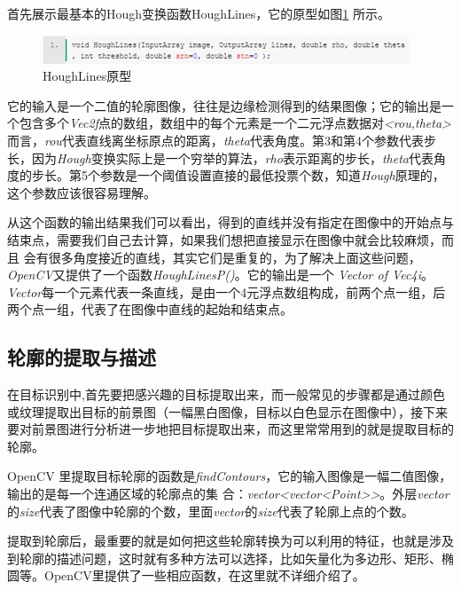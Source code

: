 \documentclass{XDBAthesis}
\begin{document}
首先展示最基本的Hough变换函数HoughLines，它的原型如图\ref{fg:yuan} 所示。
\begin{figure}[htb]
    \centering
    \includegraphics[width=\textwidth]{figure/code}
    \caption{HoughLines原型}
    \label{fg:yuan}
\end{figure}

 

    它的输入是一个二值的轮廓图像，往往是边缘检测得到的结果图像；它的输出是一个包含多个\emph{Vec2f}点的数组，数组中的每个元素是一个二元浮点数据对\emph{<rou,theta>}而言，\emph{rou}代表直线离坐标原点的距离，\emph{theta}代表角度。第3和第4个参数代表步长，因为\emph{Hough}变换实际上是一个穷举的算法，\emph{rho}表示距离的步长，\emph{theta}代表角度的步长。第5个参数是一个阈值设置直接的最低投票个数，知道\emph{Hough}原理的，这个参数应该很容易理解。

   从这个函数的输出结果我们可以看出，得到的直线并没有指定在图像中的开始点与结束点，需要我们自己去计算，如果我们想把直接显示在图像中就会比较麻烦，而且 会有很多角度接近的直线，其实它们是重复的，为了解决上面这些问题，\emph{OpenCV}又提供了一个函数\emph{HoughLinesP()}。它的输出是一个 \emph{Vector of Vec4i}。\emph{Vector}每一个元素代表一条直线，是由一个4元浮点数组构成，前两个点一组，后两个点一组，代表了在图像中直线的起始和结束点。

\subsection{轮廓的提取与描述}

在目标识别中,首先要把感兴趣的目标提取出来，而一般常见的步骤都是通过颜色或纹理提取出目标的前景图（一幅黑白图像，目标以白色显示在图像中），接下来要对前景图进行分析进一步地把目标提取出来，而这里常常用到的就是提取目标的轮廓。

OpenCV 里提取目标轮廓的函数是\emph{findContours}，它的输入图像是一幅二值图像，输出的是每一个连通区域的轮廓点的集 合：\emph{vector<vector<Point>>}。外层\emph{vector}的\emph{size}代表了图像中轮廓的个数，里面\emph{vector}的\emph{size}代表了轮廓上点的个数。

提取到轮廓后，最重要的就是如何把这些轮廓转换为可以利用的特征，也就是涉及到轮廓的描述问题，这时就有多种方法可以选择，比如矢量化为多边形、矩形、椭圆等。OpenCV里提供了一些相应函数，在这里就不详细介绍了。  


\ifx\allfiles\undefined
%

\end{document}
